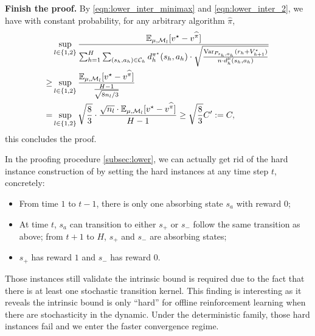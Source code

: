 \textbf{Finish the proof.}
By \eqref{eqn:lower_inter_minimax} and \eqref{eqn:lower_inter_2}, we have with constant probability, for any arbitrary algorithm $\widehat{\pi}$,
\begin{align*}
&\sup_{l\in\{1,2\}}\frac{\mathbb{E}_{\mu,\mathcal{M}_l}[v^\star-v^{\widehat{\pi}}]}{\sum_{h=1}^H\sum_{(s_h,a_h)\in\mathcal{C}_h}d^{\pi^\star}_h(s_h,a_h)\cdot\sqrt{\frac{\mathrm{Var}_{P_{s_h,a_h}}(r_h+V^\star_{h+1})}{ n\cdot d^\mu_h{(s_h,a_h)}}}}\\
\geq&\sup_{l\in\{1,2\}}\frac{\mathbb{E}_{\mu,\mathcal{M}_l}[v^\star-v^{\widehat{\pi}}]}{\frac{H-1}{\sqrt{8n_{l}/3}}}\\
=&\sup_{l\in\{1,2\}}\sqrt{\frac{8}{3}}\cdot\frac{\sqrt{n_l}\cdot\mathbb{E}_{\mu,\mathcal{M}_l}[v^\star-v^{\widehat{\pi}}]}{H-1}\geq \sqrt{\frac{8}{3}}C':=C,\\
\end{align*}
this concludes the proof.







\begin{remark}\label{remark_lower}
	In the proofing procedure \ref{subsec:lower}, we can actually get rid of the hard instance construction of \cite{jin2020pessimism} by setting the hard instances at any time step $t$, concretely:
	\begin{itemize}
		\item From time $1$ to $t-1$, there is only one absorbing state $s_a$ with reward $0$;
		\item At time $t$, $s_a$ can transition to either $s_+$ or $s_-$ follow the same transition as above; from $t+1$ to $H$, $s_+$ and $s_-$ are absorbing states;
		\item 	$s_+$ has reward $1$ and $s_-$ has reward $0$.
	\end{itemize}
	Those instances still validate the intrinsic bound is required due to the fact that there is at least one stochastic transition kernel. This finding is interesting as it reveals the intrinsic bound is only ``hard'' for offline reinforcement learning when there are stochasticity in the dynamic. Under the deterministic family, those hard instances fail and we enter the faster convergence regime. 
	
\end{remark}






